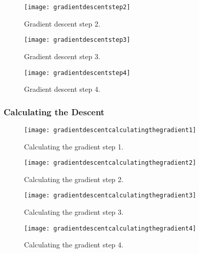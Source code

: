  	\begin{figure}[htb]
		\centering
		\texttt{[image: gradientdescentstep2]}
		\caption[Gradient descent step 2]{Gradient descent step 2.}
		\label{fig:gradientdescentstep2}
	\end{figure}

 	\begin{figure}[htb]
		\centering
		\texttt{[image: gradientdescentstep3]}
		\caption[Gradient descent step 3]{Gradient descent step 3.}
		\label{fig:gradientdescentstep3}
	\end{figure}

 	\begin{figure}[htb]
		\centering
		\texttt{[image: gradientdescentstep4]}
		\caption[Gradient descent step 4]{Gradient descent step 4.}
		\label{fig:gradientdescentstep4}
	\end{figure}

	\subsubsection{Calculating the Descent}

 	\begin{figure}[htb]
		\centering
		\texttt{[image: gradientdescentcalculatingthegradient1]}
		\caption[Calculating the gradient step 1]{Calculating the gradient step 1.}
		\label{fig:gradientdescentcalculatingthegradient1}
	\end{figure}

 	\begin{figure}[htb]
		\centering
		\texttt{[image: gradientdescentcalculatingthegradient2]}
		\caption[Calculating the gradient step 2]{Calculating the gradient step 2.}
		\label{fig:gradientdescentcalculatingthegradient2}
	\end{figure}

 	\begin{figure}[htb]
		\centering
		\texttt{[image: gradientdescentcalculatingthegradient3]}
		\caption[Calculating the gradient step 3]{Calculating the gradient step 3.}
		\label{fig:gradientdescentcalculatingthegradient3}
	\end{figure}

 	\begin{figure}[htb]
		\centering
		\texttt{[image: gradientdescentcalculatingthegradient4]}
		\caption[Calculating the gradient step 4]{Calculating the gradient step 4.}
		\label{fig:gradientdescentcalculatingthegradient4}
	\end{figure}

